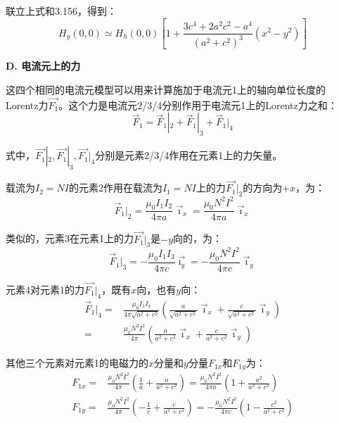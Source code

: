 联立上式和3.156，得到：
\begin{equation}
H_{y}(0,0)\simeq H_{h}(0,0)[1+\frac{3c^{4}+2a^{2}c^{2}-a^{4}}{(a^{2}+c^{2})^{3}}(x^{2}-y^{2})]%
\end{equation}

\textbf{D. 电流元上的力}

这四个相同的电流元模型可以用来计算施加于电流元1上的轴向单位长度的
Lorentz力$\vec{F_1}$。这个力是电流元2/3/4分别作用于电流元1上的Lorentz力之和：
\begin{equation}
\vec{F}_{1}=\vec{F}_{1}|_{2}+\vec{F}_{1}|_{3}+\vec{F}_{1}|_{4}%
\end{equation}

式中，$\vec{F_1}|_2, \vec{F_1}|_3, \vec{F_1}|_4$分别是元素2/3/4作用在元素1上的力矢量。

载流为$I_2=NI$的元素2作用在载流为$I_1=NI$上的力$\vec{F_1}|_2$的方向为$+x$，为：
\begin{equation}
\vec{F}_{1}|_{2}=\frac{\mu_{0}I_{1}I_{2}}{4\pi a}\vec{\imath}_{x}=\frac{\mu_{0}N^{2}I^{2}}{4\pi a}\vec{\imath}_{x}%
\end{equation}

类似的，元素3在元素1上的力$\vec{F_1}|_3$是$-y$向的，为：
\begin{equation}
\vec{F}_{1}|_{3}=-\frac{\mu_{0}I_{1}I_{3}}{4\pi c}\vec{\imath_{y}}=-\frac{\mu_{0}N^{2}I^{2}}{4\pi c}\vec{\imath}_{y}%
\end{equation}

元素4对元素1的力$\vec{F_1}|_4$，既有$x$向，也有$y$向：
\begin{equation}
\begin{split}
\vec{F}_{1}|_{4}=&\frac{\mu_{0}I_{1}I_{4}}{4\pi\sqrt{a^{2}+c^{2}}}(\frac{a}{\sqrt{a^{2}+c^{2}}}\vec{\imath}_{x}+\frac{c}{\sqrt{a^{2}+c^{2}}}\vec{\imath}_{y})\\
=&\frac{\mu_{0}N^{2}I^{2}}{4\pi}(\frac{a}{a^{2}+c^{2}}\vec{\imath}_{x}+\frac{c}{a^{2}+c^{2}}\vec{\imath}_{y})%
\end{split}
\end{equation}

其他三个元素对元素1的电磁力的$x$分量和$y$分量$F_{1x}$和$F_{1y}$为：
\begin{eqnarray}
F_{1x}=&\frac{\mu_{0}N^{2}I^{2}}{4\pi}(\frac{1}{a}+\frac{a}{a^{2}+c^{2}})=\frac{\mu_{0}N^{2}I^{2}}{4\pi a}(1+\frac{a^{2}}{a^{2}+c^{2}})\\%
F_{1y}=&\frac{\mu_{0}N^{2}I^{2}}{4\pi}(-\frac{1}{c}+\frac{c}{a^{2}+c^{2}})=-\frac{\mu_{0}N^{2}I^{2}}{4\pi c}(1-\frac{c^{2}}{a^{2}+c^{2}})%
\end{eqnarray}

